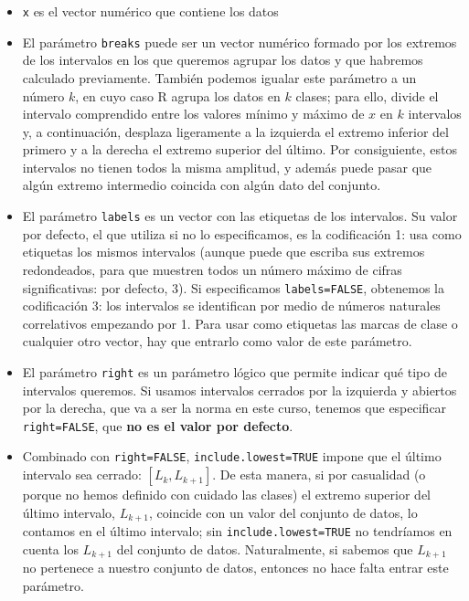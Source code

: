 \documentclass[
]{book}
\theoremstyle{definition}
\theoremstyle{definition}
\theoremstyle{definition}
\theoremstyle{remark}
\begin{document}
\begin{itemize}
\item
  \texttt{x} es el vector numérico que contiene los datos
\item
  El parámetro \texttt{breaks} puede ser un vector numérico formado por los extremos de los intervalos en los que queremos agrupar los datos y que habremos calculado previamente. También podemos igualar este parámetro a un número \(k\), en cuyo caso R agrupa los datos en \(k\) clases; para ello, divide el intervalo comprendido entre los valores mínimo y máximo de \(x\) en \(k\) intervalos y, a continuación, desplaza ligeramente a la izquierda el extremo inferior del primero y a la derecha el extremo superior del último. Por consiguiente, estos intervalos no tienen todos la misma amplitud, y además puede pasar que algún extremo intermedio coincida con algún dato del conjunto.
\item
  El parámetro \texttt{labels} es un vector con las etiquetas de los intervalos. Su valor por defecto, el que utiliza si no lo especificamos, es la codificación 1: usa como etiquetas los mismos intervalos (aunque puede que escriba sus extremos redondeados, para que muestren todos un número máximo de cifras significativas: por defecto, 3). Si especificamos \texttt{labels=FALSE}, obtenemos la codificación 3: los intervalos se identifican por medio de números naturales correlativos empezando por 1. Para usar como etiquetas las marcas de clase o cualquier otro vector, hay que entrarlo como valor de este parámetro.
\item
  El parámetro \texttt{right} es un parámetro lógico que permite indicar qué tipo de intervalos queremos. Si usamos intervalos cerrados por la izquierda y abiertos por la derecha, que va a ser la norma en este curso, tenemos que especificar \texttt{right=FALSE}, que \textbf{no es el valor por defecto}.
\item
  Combinado con \texttt{right=FALSE}, \texttt{include.lowest=TRUE} impone que el último intervalo sea cerrado: \([L_k,L_{k+1}]\). De esta manera, si por casualidad (o porque no hemos definido con cuidado las clases) el extremo superior del último intervalo, \(L_{k+1}\), coincide con un valor del conjunto de datos, lo contamos en el último intervalo;
  sin \texttt{include.lowest=TRUE} no tendríamos en cuenta los \(L_{k+1}\) del conjunto de datos. Naturalmente, si sabemos que \(L_{k+1}\) no pertenece a nuestro conjunto de datos, entonces no hace falta entrar este parámetro.
\end{itemize}
\end{document}
